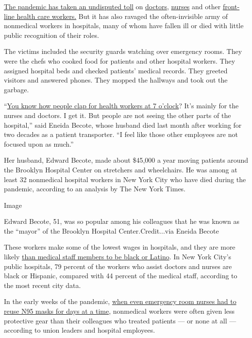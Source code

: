 \href{https://www.nytimes.com/2020/03/30/nyregion/ny-coronavirus-doctors-sick.html}{The
pandemic has taken an undisputed toll} on
\href{https://www.nytimes.com/2020/04/27/nyregion/new-york-city-doctor-suicide-coronavirus.html}{doctors},
\href{https://www.nytimes.com/2020/03/26/nyregion/nurse-dies-coronavirus-mount-sinai.html}{nurses}
and other
\href{https://www.nytimes.com/2020/04/15/nyregion/coronavirus-woodhull-madhvi-aya-dead.html}{front-line
health care workers.} But it has also ravaged the often-invisible army
of nonmedical workers in hospitals, many of whom have fallen ill or died
with little public recognition of their roles.

The victims included the security guards watching over emergency rooms.
They were the chefs who cooked food for patients and other hospital
workers. They assigned hospital beds and checked patients' medical
records. They greeted visitors and answered phones. They mopped the
hallways and took out the garbage.

``\href{https://www.nytimes.com/interactive/2020/04/10/nyregion/nyc-7pm-cheer-thank-you-coronavirus.html}{You
know how people clap for health workers at 7 o'clock}? It's mainly for
the nurses and doctors. I get it. But people are not seeing the other
parts of the hospital,'' said Eneida Becote, whose husband died last
month after working for two decades as a patient transporter. ``I feel
like those other employees are not focused upon as much.''

Her husband, Edward Becote, made about \$45,000 a year moving patients
around the Brooklyn Hospital Center on stretchers and wheelchairs. He
was among at least 32 nonmedical hospital workers in New York City who
have died during the pandemic, according to an analysis by The New York
Times.

Image

Edward Becote, 51, was so popular among his colleagues that he was known
as the ``mayor'' of the Brooklyn Hospital Center.Credit...via Eneida
Becote

These workers make some of the lowest wages in hospitals, and they are
more likely
\href{https://www.nytimes.com/2020/04/08/nyregion/coronavirus-race-deaths.html}{than
medical staff members to be black or Latino}. In New York City's public
hospitals, 79 percent of the workers who assist doctors and nurses are
black or Hispanic, compared with 44 percent of the medical staff,
according to the most recent city data.

In the early weeks of the pandemic,
\href{https://www.nytimes.com/2020/03/19/us/hospitals-coronavirus-ppe-shortage.html}{when
even emergency room nurses had to reuse N95 masks for days at a time},
nonmedical workers were often given less protective gear than their
colleagues who treated patients --- or none at all --- according to
union leaders and hospital employees.

